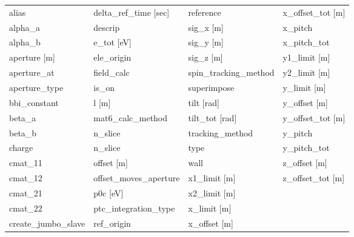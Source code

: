  \begin{tabular}{llll} \toprule
alias                          & delta_ref_time [sec]           & reference                      & x_offset_tot [m]               \\
alpha_a                        & descrip                        & sig_x [m]                      & x_pitch                        \\
alpha_b                        & e_tot [eV]                     & sig_y [m]                      & x_pitch_tot                    \\
aperture [m]                   & ele_origin                     & sig_z [m]                      & y1_limit [m]                   \\
aperture_at                    & field_calc                     & spin_tracking_method           & y2_limit [m]                   \\
aperture_type                  & is_on                          & superimpose                    & y_limit [m]                    \\
bbi_constant                   & l [m]                          & tilt [rad]                     & y_offset [m]                   \\
beta_a                         & mat6_calc_method               & tilt_tot [rad]                 & y_offset_tot [m]               \\
beta_b                         & n_slice                        & tracking_method                & y_pitch                        \\
charge                         & n_slice                        & type                           & y_pitch_tot                    \\
cmat_11                        & offset [m]                     & wall                           & z_offset [m]                   \\
cmat_12                        & offset_moves_aperture          & x1_limit [m]                   & z_offset_tot [m]               \\
cmat_21                        & p0c [eV]                       & x2_limit [m]                   &                                \\
cmat_22                        & ptc_integration_type           & x_limit [m]                    &                                \\
create_jumbo_slave             & ref_origin                     & x_offset [m]                   &                                \\
 \bottomrule
 \end{tabular}
 \vfill
 
